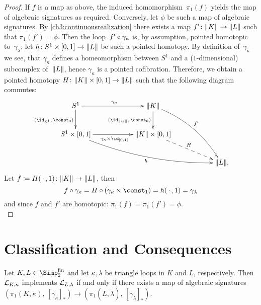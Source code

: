 \begin{proof}
    If $f$ is a map as above, the induced homomorphism~$\pi_1(f)$ yields
    the map of algebraic signatures as required. Conversely, let $\phi$
    be such a map of algebraic signatures. By \cref{ch3:continuousrealization}
    there exists a map $f'\colon\lVert K\rVert\to\lVert L\rVert$ such that $\pi_1(f')=\phi$.
    Then the loop~$f'\after\gamma_\kappa$ is, by assumption, pointed homotopic
    to~$\gamma_\lambda$; let $h\colon S^1\times[0,1]\to\lVert L\rVert$ be such a
    pointed homotopy. By definition of~$\gamma_\kappa$ we see, that
    $\gamma_\kappa$ defines a homeomorphism between $S^1$ and a
    ($1$-dimensional) subcomplex of~$\lVert L\rVert$, hence $\gamma_\kappa$
    is a pointed cofibration. %
    Therefore, we obtain a pointed homotopy
    $H\colon\lVert K\rVert\times[0,1]\to\lVert L\rVert$ such that the following diagram
    commutes:
    \[
        \xymatrix@C=2cm{
            S^1
                \ar[r]^{\gamma_\kappa}
                \ar[d]_{(\id_{S^1},\,\const_0)}
            & \geom K
                \ar[d]_{(\id_{\geom K},\,\const_0)}
                \ar@/^1pc/[rdd]^{f'}
            \\
            S^1\times[0,1]
                \ar[r]_{\gamma_\kappa\times\id_{[0,1]}}
                \ar@/_1pc/[rrd]_h
            & \geom{K}\times[0,1]
                \ar@{-->}[rd]^H
            \\
            & & \geom L
            \rlap{.}
        }
    \]
    Let $f \coloneqq H(\,\cdot\,,1)\colon \lVert K\rVert\to \lVert L\rVert$, then
    \[ f\after\gamma_\kappa = H \after (\gamma_\kappa\times\const_1)
        = h(\scdot,1) = \gamma_\lambda
    \]
    and since $f$ and $f'$ are homotopic: $\pi_1(f) = \pi_1(f') = \phi$.
    \\
\end{proof}


\section{Classification and Consequences}
\label{ch2:sec:consequences}
%
\begin{thTheorem}
    \label{ch3:classification}
    Let $K,L\in\finSimp$ and let $\kappa,\lambda$ be triangle loops
    in $K$ and $L$, respectively.
    Then $\mathcal{L}_{K,\kappa}$ implements $\mathcal{L}_{L,\lambda}$ if and only if
    there exists a map of algebraic signatures
    $( \pi_1(K,\dot\kappa), \, [\gamma_\kappa]_\ast )
        \to ( \pi_1(L,\dot\lambda), \, [\gamma_\lambda]_\ast )$.
\end{thTheorem}

